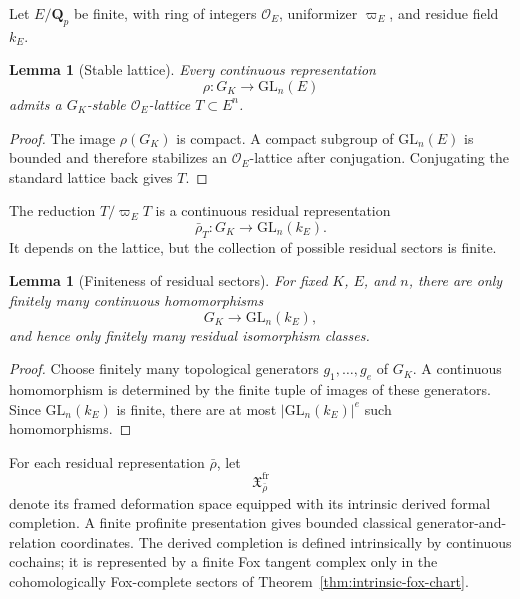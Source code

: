 \documentclass[11pt]{article}
\newtheorem{lemma}[theorem]{Lemma}
\theoremstyle{definition}
\newcommand{\Qp}{\mathbf Q_p}
\begin{document}
Let $E/\Qp$ be finite, with ring of integers $\mathcal O_E$, uniformizer $\varpi_E$, and residue field $k_E$.

\begin{lemma}[Stable lattice]\label{lem:stable-lattice}
Every continuous representation
\[
\rho:G_K\longrightarrow \mathrm{GL}_n(E)
\]
admits a $G_K$-stable $\mathcal O_E$-lattice $T\subset E^n$.
\end{lemma}

\begin{proof}
The image $\rho(G_K)$ is compact.  A compact subgroup of $\mathrm{GL}_n(E)$ is bounded and therefore stabilizes an $\mathcal O_E$-lattice after conjugation.  Conjugating the standard lattice back gives $T$.
\end{proof}

The reduction $T/\varpi_ET$ is a continuous residual representation
\[
\bar\rho_T:G_K\longrightarrow \mathrm{GL}_n(k_E).
\]
It depends on the lattice, but the collection of possible residual sectors is finite.

\begin{lemma}[Finiteness of residual sectors]\label{lem:finite-residual-sectors}
For fixed $K$, $E$, and $n$, there are only finitely many continuous homomorphisms
\[
G_K\longrightarrow \mathrm{GL}_n(k_E),
\]
and hence only finitely many residual isomorphism classes.
\end{lemma}

\begin{proof}
Choose finitely many topological generators $g_1,\ldots,g_e$ of $G_K$.  A continuous homomorphism is determined by the finite tuple of images of these generators.  Since $\mathrm{GL}_n(k_E)$ is finite, there are at most $|\mathrm{GL}_n(k_E)|^e$ such homomorphisms.
\end{proof}

For each residual representation $\bar\rho$, let
\[
\mathfrak X_{\bar\rho}^{\mathrm{fr}}
\]
denote its framed deformation space equipped with its intrinsic derived formal completion.  A finite profinite presentation gives bounded classical generator-and-relation coordinates.  The derived completion is defined intrinsically by continuous cochains; it is represented by a finite Fox tangent complex only in the cohomologically Fox-complete sectors of Theorem~\ref{thm:intrinsic-fox-chart}.
\end{document}

